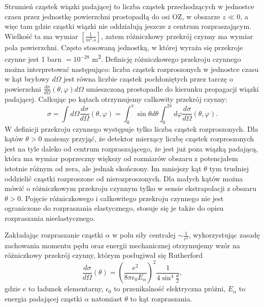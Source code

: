 \documentclass[11pt]{book}
\theoremstyle{definition}
\begin{document}
Strumień cząstek wiązki padającej to liczba cząstek przechodzących w jednostce czasu przez jednostkę powierzchni prostopadłą do osi OZ, w obszarze $z \ll 0$, a więc tam gdzie cząstki wiązki nie oddziałują jeszcze z centrum rozpraszającym. Wielkość ta ma wymiar $\left[\frac{1}{\si{m^2.s}}\right]$, zatem różniczkowy przekrój czynny ma wymiar pola powierzchni. Często stosowaną jednostką, w której wyraża się przekroje czynne jest 1 barn $= 10^{-28}$ \si{m^{2}}. Definicję różniczkowego przekroju czynnego można interpretować następująco: liczba cząstek rozproszonych w jednostce czasu w kąt bryłowy $d\Omega$ jest równa liczbie cząstek pochłoniętych przez tarczę o powierzchni $\frac{d\sigma}{d\Omega} \left( \theta, \varphi \right)d\Omega$ umieszczoną prostopadle do kierunku propagacji wiązki padającej. Całkując po kątach otrzymujemy całkowity przekrój czynny: 
\begin{equation}
\sigma = \int d\Omega \frac{d\sigma}{d\Omega} \left(\theta, \varphi\right) = \int_{0}^{\pi}\sin \theta d\theta \int_{0}^{2\pi} d\varphi \frac{d\sigma}{d\Omega}\left(\theta, \varphi\right).
\end{equation}
W definicji przekroju czynnego występuje tylko liczba cząstek rozproszonych. Dla kątów $\theta > 0$ możemy przyjąć, że detektor mierzący liczbę cząstek rozproszonych jest na tyle daleko od centrum rozpraszającego, że jest już poza wiązką padającą, która ma wymiar poprzeczny większy od rozmiarów obszaru z potencjałem istotnie różnym od zera, ale jednak skończony. Im mniejszy kąt $\theta$ tym trudniej oddzielić cząstki rozproszone od nierozproszonych. Dla małych kątów można mówić o różniczkowym przekroju czynnym tylko w sensie ekstrapolacji z obszaru $\theta > 0$. Pojęcie różniczkowego i całkowitego przekroju czynnego nie jest ograniczone do rozpraszania elastycznego, stosuje się je także do opisu rozpraszania nieelastycznego.
%

Zakładając rozpraszanie cząstki $\alpha$ w polu siły centralej $\sim \frac{1}{r^2}$, wykorzystując zasadę zachowania momentu pędu oraz energii mechanicznej otrzymujemy wzór na różniczkowy przekrój czynny, którym posługiwał się Rutherford \cite{10.1088/978-0-7503-1140-3}
%
\begin{equation}
\frac{d\sigma}{d\Omega}\left(\theta\right) = \left(\frac{e^2}{8 \pi \epsilon_0  E_{\alpha}} \right)^2 \frac{1}{4\sin^4 \frac{\theta}{2}},
\end{equation}
%
gdzie $e$ to ładunek elementarny, $\epsilon_0$ to przenikalność elektryczna próżni, $E_{\alpha}$ to energia padającej cząstki $\alpha$ natomiast $\theta$ to kąt rozpraszania.
\end{document}
